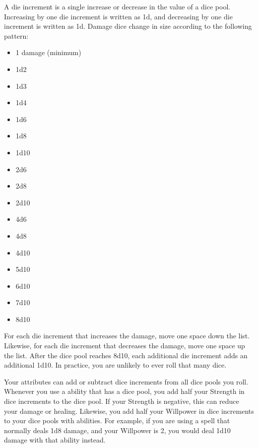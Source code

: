             A die increment is a single increase or decrease in the value of a dice pool.
            Increasing by one die increment is written as \plus1d, and decreasing by one die increment is written as \minus1d.
            Damage dice change in size according to the following pattern:
            \begin{itemize}
                \item 1 damage (minimum)
                \item 1d2
                \item 1d3
                \item 1d4
                \item 1d6
                \item 1d8
                \item 1d10
                \item 2d6
                \item 2d8
                \item 2d10
                \item 4d6
                \item 4d8
                \item 4d10
                \item 5d10
                \item 6d10
                \item 7d10
                \item 8d10
            \end{itemize}

            For each die increment that increases the damage, move one space down the list.
            Likewise, for each die increment that decreases the damage, move one space up the list.
            After the dice pool reaches 8d10, each additional die increment adds an additional 1d10.
            In practice, you are unlikely to ever roll that many dice.

             Your attributes can add or subtract dice increments from all dice pools you roll.
            Whenever you use a  ability that has a dice pool, you add half your Strength in dice increments to the dice pool.
            If your Strength is negative, this can reduce your damage or healing.
            Likewise, you add half your Willpower in dice increments to your dice pools with  abilities.
            For example, if you are using a spell that normally deals 1d8 damage, and your Willpower is 2, you would deal 1d10 damage with that ability instead.

